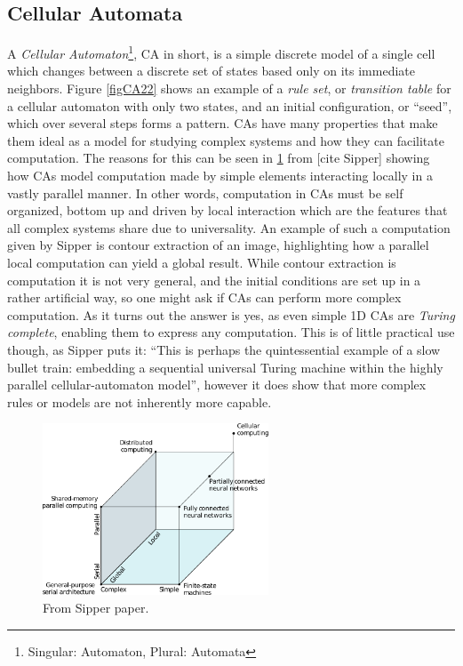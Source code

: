 \subsection{Cellular Automata}
A \emph{Cellular Automaton}\footnote{Singular: Automaton, Plural: Automata}, CA
in short, is a simple discrete model of a single cell which changes between a
discrete set of states based only on its immediate neighbors.
Figure \ref{figCA22} shows an example of a \emph{rule set}, or \emph{transition
  table} for a cellular automaton with only two states, and an initial
configuration, or ``seed'', which over several steps forms a pattern.
%
CAs have many properties that make them ideal as a model for studying complex
systems and how they can facilitate computation.
The reasons for this can be seen in \ref{figSipperClass} from [cite Sipper] showing how
CAs model computation made by simple elements interacting locally in a vastly
parallel manner.
%
In other words, computation in CAs must be self organized, bottom up and driven by
local interaction which are the features that all complex systems share due to
universality.
%
An example of such a computation given by Sipper is contour extraction of an
image, highlighting how a parallel local computation can yield a global result.
%
While contour extraction is computation it is not very general, and the initial
conditions are set up in a rather artificial way, so one might ask if CAs can
perform more complex computation.
As it turns out the answer is yes, as even simple 1D CAs are \emph{Turing
  complete}, enabling them to express any computation.
This is of little practical use though, as Sipper puts it: ``This is perhaps the
quintessential example of a slow bullet train: embedding a sequential universal
Turing machine within the highly parallel cellular-automaton model'', however it
does show that more complex rules or models are not inherently more capable.
\begin{figure}[h!]
  \centering
  \includegraphics[width=0.6\textwidth]{fig/sipperComp.png}
  \caption{From Sipper paper.}
  \label{figSipperClass}
\end{figure}
